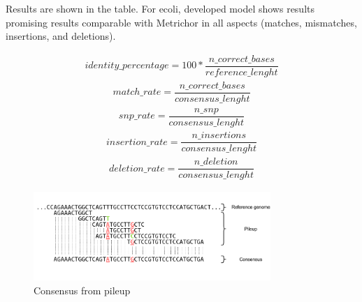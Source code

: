 \documentclass[times, utf8, diplomski, numeric, english]{fer}
\begin{document}
Results are shown in the table. 
For ecoli, developed model shows results promising results comparable with Metrichor in all aspects (matches, mismatches, insertions, and deletions). 

\begin{equation}
\begin{gathered}
identity\_percentage =  100 * \dfrac{n\_correct\_bases}{reference\_lenght}
\end{gathered}
\end{equation}
\begin{equation}
\begin{gathered}
match\_rate = \dfrac{n\_correct\_bases}{consensus\_lenght}
\end{gathered}
\end{equation}
\begin{equation}
\begin{gathered}
snp\_rate = \dfrac{n\_snp}{consensus\_lenght}
\end{gathered}
\end{equation}
\begin{equation}
\begin{gathered}
insertion\_rate = \dfrac{n\_insertions}{consensus\_lenght}
\end{gathered}
\end{equation}
\begin{equation}
\begin{gathered}
deletion\_rate = \dfrac{n\_deletion}{consensus\_lenght}
\end{gathered}
\end{equation}



\begin{figure}[!ht]
	\begin{center}
		\includegraphics[width=0.8\textwidth]{./imgs/consnesus.png}
		\caption{Consensus from pileup}
		\label{fg:consensus}
	\end{center}
\end{figure}
\end{document}
